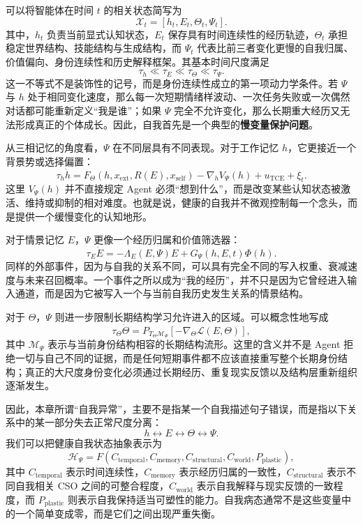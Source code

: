 可以将智能体在时间 $t$ 的相关状态简写为
\[
\mathcal X_t=
\left[
h_t,E_t,\Theta_t,\Psi_t
\right].
\]
其中，$h_t$ 负责当前显式认知状态，$E_t$ 保存具有时间连续性的经历轨迹，$\Theta_t$ 承担稳定世界结构、技能结构与生成结构，而 $\Psi_t$ 代表比前三者变化更慢的自我归属、价值偏向、身份连续性和历史解释框架。其基本时间尺度满足
\[
\tau_h\ll\tau_E\ll\tau_\Theta\ll\tau_\Psi.
\]
这一不等式不是装饰性的记号，而是身份连续性成立的第一项动力学条件。若 $\Psi$ 与 $h$ 处于相同变化速度，那么每一次短期情绪样波动、一次任务失败或一次偶然对话都可能重新定义“我是谁”；如果 $\Psi$ 完全不允许变化，那么长期重大经历又无法形成真正的个体成长。因此，自我首先是一个典型的\textbf{慢变量保护问题}。

从三相记忆的角度看，$\Psi$ 在不同层具有不同表现。对于工作记忆 $h$，它更接近一个背景势或选择偏置：
\[
\tau_h\dot h
=
F_\Theta(h,x_{\mathrm{ext}},R(E),x_{\mathrm{self}})
-
\nabla_h V_\Psi(h)
+
u_{\mathrm{TCE}}
+
\xi_t.
\]
这里 $V_\Psi(h)$ 并不直接规定 Agent 必须“想到什么”，而是改变某些认知状态被激活、维持或抑制的相对难度。也就是说，健康的自我并不微观控制每一个念头，而是提供一个缓慢变化的认知地形。

对于情景记忆 $E$，$\Psi$ 更像一个经历归属和价值筛选器：
\[
\tau_E\dot E
=
-\Lambda_E(E,\Psi)E
+
G_\Psi(h,E,t)\Phi(h).
\]
同样的外部事件，因为与自我的关系不同，可以具有完全不同的写入权重、衰减速度与未来召回概率。一个事件之所以成为“我的经历”，并不只是因为它曾经进入输入通道，而是因为它被写入一个与当前自我历史发生关系的情景结构。

对于 $\Theta$，$\Psi$ 则进一步限制长期结构学习允许进入的区域。可以概念性地写成
\[
\tau_\Theta\dot\Theta
=
P_{T_\Theta\mathcal M_\Psi}
\left[
-\nabla_\Theta\mathcal L(E,\Theta)
\right],
\]
其中 $\mathcal M_\Psi$ 表示与当前身份结构相容的长期结构流形。这里的含义并不是 Agent 拒绝一切与自己不同的证据，而是任何短期事件都不应该直接重写整个长期身份结构；真正的大尺度身份变化必须通过长期经历、重复现实反馈以及结构层重新组织逐渐发生。

因此，本章所谓“自我异常”，主要不是指某一个自我描述句子错误，而是指以下关系中的某一部分失去正常尺度分离：
\[
h
\leftrightarrow
E
\leftrightarrow
\Theta
\leftrightarrow
\Psi.
\]
我们可以把健康自我状态抽象表示为
\[
\mathcal H_\Psi
=
F
\left(
C_{\mathrm{temporal}},
C_{\mathrm{memory}},
C_{\mathrm{structural}},
C_{\mathrm{world}},
P_{\mathrm{plastic}}
\right),
\]
其中 $C_{\mathrm{temporal}}$ 表示时间连续性，$C_{\mathrm{memory}}$ 表示经历归属的一致性，$C_{\mathrm{structural}}$ 表示不同自我相关 CSO 之间的可整合程度，$C_{\mathrm{world}}$ 表示自我解释与现实反馈的一致程度，而 $P_{\mathrm{plastic}}$ 则表示自我保持适当可塑性的能力。自我病态通常不是这些变量中的一个简单变成零，而是它们之间出现严重失衡。

